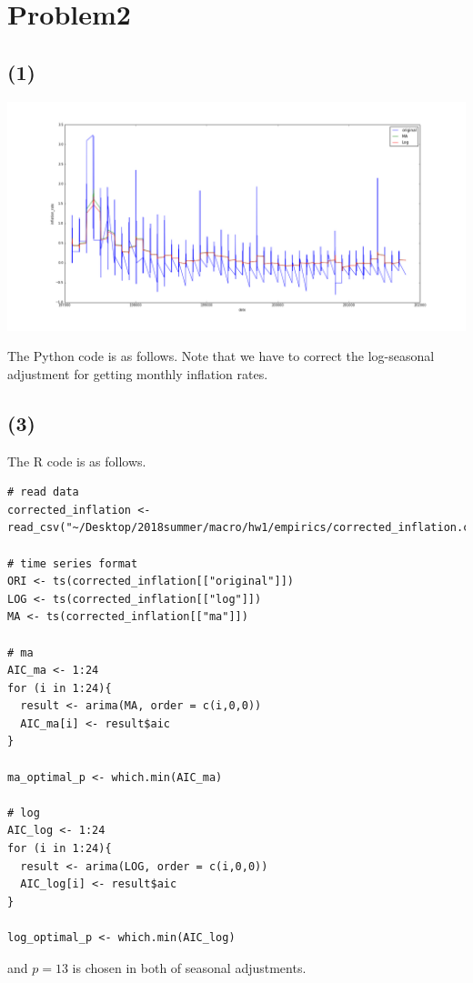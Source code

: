 \documentclass{article}
\begin{document}
\section{Problem2}
\subsection{(1)}
\includegraphics[width = 15cm]{inflation.png}

The Python code is as follows. Note that we have to correct the log-seasonal adjustment for getting monthly inflation rates.


\subsection{(3)}
The R code is as follows.
\begin{lstlisting}
# read data
corrected_inflation <- read_csv("~/Desktop/2018summer/macro/hw1/empirics/corrected_inflation.csv")

# time series format
ORI <- ts(corrected_inflation[["original"]])
LOG <- ts(corrected_inflation[["log"]])
MA <- ts(corrected_inflation[["ma"]])

# ma
AIC_ma <- 1:24
for (i in 1:24){
  result <- arima(MA, order = c(i,0,0))
  AIC_ma[i] <- result$aic
}

ma_optimal_p <- which.min(AIC_ma)

# log
AIC_log <- 1:24
for (i in 1:24){
  result <- arima(LOG, order = c(i,0,0))
  AIC_log[i] <- result$aic
}

log_optimal_p <- which.min(AIC_log)
\end{lstlisting}
and $p = 13$ is chosen in both of seasonal adjustments.
\end{document}
